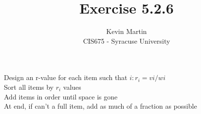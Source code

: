 \documentclass{article}
\author{Kevin Martin\\ CIS675 - Syracuse University}
\title{Exercise 5.2.6}
\begin{document}
\maketitle
Design an r-value for each item such that $i: r_{i} = vi/wi$\\
Sort all items by $r_{i}$ values\\
Add items in order until space is gone\\
At end, if can’t a full item, add as much of a fraction as possible\\
\end{document}
